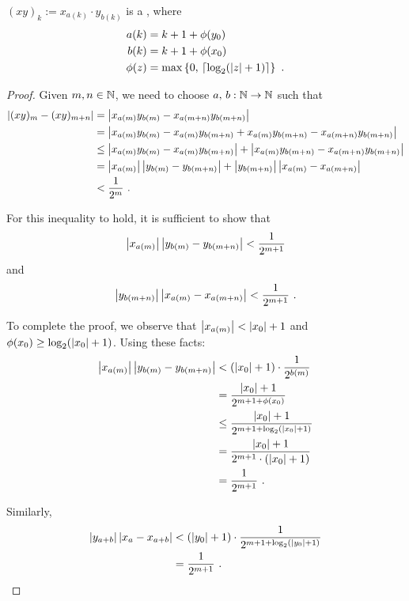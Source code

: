\documentclass[leqno]{report}
\begin{document}
\begin{Proposition}[Multiplication]
    $(xy)_k := x_{a(k)} \cdot y_{b(k)}$ is a \FCCS, where
    \begin{align*}
        a(k) &= k + 1 + \phi(y_0) \\
        b(k) &= k + 1 + \phi(x_0) \\
        \phi(z) &= \max \left\{  0,\, \left\lceil \log_2(\left| z \right| + 1) \right\rceil  \right\}
        \ .
    \end{align*}
\end{Proposition}

\begin{proof}
    Given $m, n \in \mathbb{N}$, we need to choose $a,\, b : \mathbb{N} \rightarrow \mathbb{N}$ such that
    \begin{align*}
        \left| (xy)_m - (xy)_{m+n} \right|
        &= \left| x_{a(m)} y_{b(m)} - x_{a(m+n)} y_{b(m+n)} \right| \\
        &= \left| x_{a(m)} y_{b(m)} - x_{a(m)} y_{b(m+n)} + x_{a(m)} y_{b(m+n)} - x_{a(m+n)} y_{b(m+n)} \right| \\
        &\leq \left| x_{a(m)} y_{b(m)} - x_{a(m)} y_{b(m+n)} \right| + \left| x_{a(m)} y_{b(m+n)} - x_{a(m+n)} y_{b(m+n)} \right| \\
        &= \left| x_{a(m)} \right|\left| y_{b(m)} - y_{b(m+n)} \right| + \left| y_{b(m+n)} \right|\left| x_{a(m)} - x_{a(m+n)} \right| \\
        &< \frac{1}{2^m}
        \ .
    \end{align*}

    For this inequality to hold, it is sufficient to show that
    \[ \left| x_{a(m)} \right|\left| y_{b(m)} - y_{b(m+n)} \right| < \frac{1}{2^{m+1}} \]
    and
    \[ \left| y_{b(m+n)} \right|\left| x_{a(m)} - x_{a(m+n)} \right| < \frac{1}{2^{m+1}} \ . \]

    To complete the proof, we observe that $\left| x_{a(m)} \right| < \left| x_0 \right| + 1$ and $\phi(x_0) \geq \log_2(\left| x_0 \right| + 1)$. Using these facts:
    \begin{align*}
        \left| x_{a(m)} \right|\left| y_{b(m)} - y_{b(m+n)} \right|
        &< (\left| x_0 \right| + 1) \cdot \frac{1}{2^{b(m)}} \\
        &= \frac{\left| x_0 \right| + 1}{2^{m + 1 + \phi(x_0)}} \\
        &\leq \frac{\left| x_0 \right| + 1}{2^{m + 1 + \log_2(\left| x_0 \right| + 1)}} \\
        &= \frac{\left| x_0 \right| + 1}{2^{m + 1} \cdot (\left| x_0 \right| + 1)} \\
        &= \frac{1}{2^{m + 1}}
        \ .
    \end{align*}

    Similarly,
    \begin{align*}
        \left| y_{a+b} \right|\left| x_a - x_{a+b} \right|
        &< (\left| y_0 \right| + 1) \cdot \frac{1}{2^{m + 1 + \log_2(\left| y_0 \right| + 1)}} \\
        &= \frac{1}{2^{m + 1}}
        \ . \qedhere
    \end{align*}
\end{proof}
\end{document}
